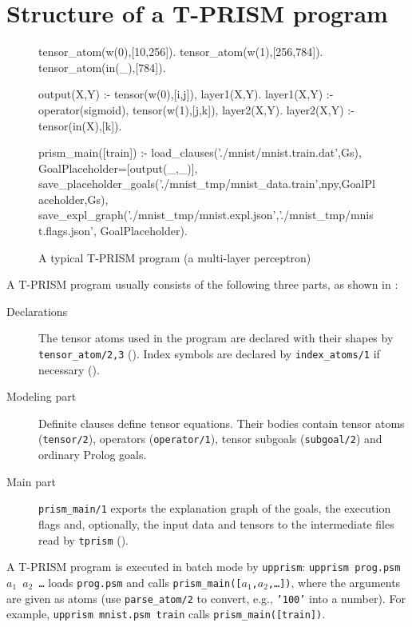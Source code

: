 \documentclass[a4paper]{report}
\begin{document}
\section{Structure of a T-PRISM program}
\label{sec:program_structure}

\begin{figure}[tb]
\begin{prologcode}[numbers=left]
tensor_atom(w(0),[10,256]).   %
tensor_atom(w(1),[256,784]).  %
tensor_atom(in(_),[784]).     %

output(X,Y) :- tensor(w(0),[i,j]), layer1(X,Y).
layer1(X,Y) :- operator(sigmoid), tensor(w(1),[j,k]), layer2(X,Y).
layer2(X,Y) :- tensor(in(X),[k]).

prism_main([train]) :-
    load_clauses('./mnist/mnist.train.dat',Gs),
    GoalPlaceholder=[output(_,_)],
    save_placeholder_goals('./mnist_tmp/mnist_data.train',npy,GoalPlaceholder,Gs),
    save_expl_graph('./mnist_tmp/mnist.expl.json','./mnist_tmp/mnist.flags.json',
                    GoalPlaceholder).
\end{prologcode}
\caption{A typical T-PRISM program (a multi-layer perceptron)}
\label{fig:structure}
\end{figure}

A T-PRISM program usually consists of the following three parts,
as shown in :
\begin{description}
	\item[Declarations]
	The tensor atoms used in the program are declared with their shapes by
	{\tt tensor\_atom/2,3} ().  Index symbols
	are declared by {\tt index\_atoms/1} if necessary ().
	\item[Modeling part]
	Definite clauses define tensor equations.  Their bodies contain tensor
	atoms ({\tt tensor/2}), operators ({\tt operator/1}), tensor subgoals
	({\tt subgoal/2}) and ordinary Prolog goals.
	\item[Main part]
	{\tt prism\_main/1} exports the explanation graph of the goals, the
	execution flags and, optionally, the input data and tensors to the
	intermediate files read by {\tt tprism} ().
\end{description}

A T-PRISM program is executed in batch mode by {\tt upprism}:
{\tt upprism prog.psm $a_1$ $a_2$ \ldots} loads {\tt prog.psm} and calls
{\tt prism\_main([$a_1$,$a_2$,\ldots])}, where the arguments are given as
atoms (use {\tt parse\_atom/2} to convert, e.g., {\tt '100'} into a number).
For example, {\tt upprism mnist.psm train} calls {\tt prism\_main([train])}.
\end{document}
